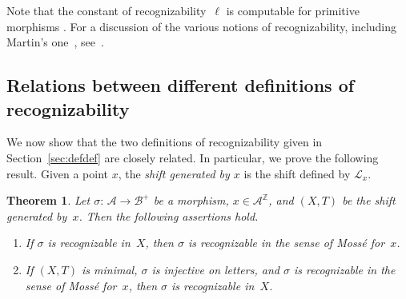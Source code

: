 \documentclass{amsart}
\newtheorem{theorem}[lemma]{Theorem}
\theoremstyle{definition}
\theoremstyle{remark}
\numberwithin{equation}{section}
\begin{document}
Note that the constant of recognizability~$\ell$ is computable for primitive morphisms \cite{Durand-Leroy}.
For a discussion of the various notions of recognizability, including Martin's one~\cite{Martin:71}, see~\cite{Mosse:96,Crabb:10}. 

\subsection{Relations between different definitions of recognizability} \label{sec:recdef}

We now show that the two definitions of recognizability given in Section~\ref{sec:defdef} are closely related. In particular, we prove the following result. Given a point $x$, the \emph{shift generated by $x$} is the shift defined by $\mathcal L_x$.

\begin{theorem}\label{equivalence}
Let $\sigma:\, \mathcal{A} \to \mathcal{B}^+$ be a morphism, $x \in \mathcal{A}^\mathbb{Z}$, and $(X,T)$ be the shift generated by~$x$. 
Then the following assertions hold. 
\begin{enumerate}
\item
If $\sigma$ is recognizable in~$X$, then $\sigma$ is recognizable in the sense of Moss\'{e} for~$x$.
\item 
If $(X,T)$ is minimal, $\sigma$ is injective on letters, and $\sigma$ is recognizable in the sense of Moss\'{e} for~$x$, then $\sigma$ is recognizable in~$X$. 
\end{enumerate}
\end{theorem}
\end{document}
